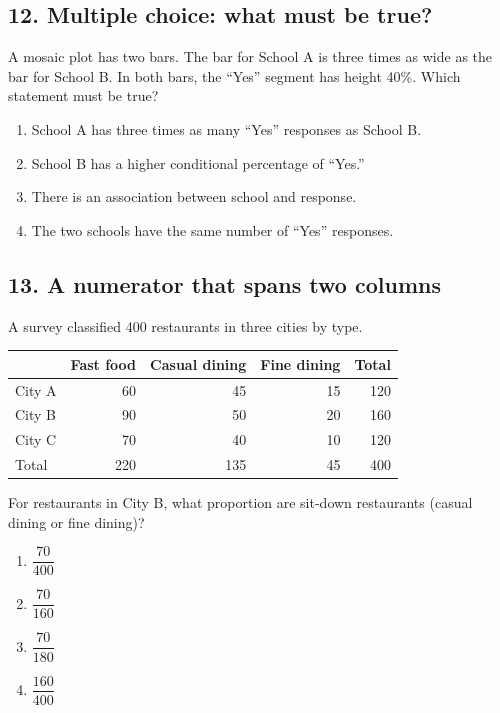 \documentclass[11pt]{article}
\begin{document}
\subsection*{12. Multiple choice: what must be true?}
A mosaic plot has two bars. The bar for School A is three times as wide as the bar for School B. In both bars, the ``Yes'' segment has height 40\%. Which statement must be true?
\par\medskip
\begin{enumerate}[label=\Alph*),itemsep=6pt]
  \item School A has three times as many ``Yes'' responses as School B.
  \item School B has a higher conditional percentage of ``Yes.''
  \item There is an association between school and response.
  \item The two schools have the same number of ``Yes'' responses.
\end{enumerate}

\Needspace{2.2in}
\subsection*{13. A numerator that spans two columns}
A survey classified 400 restaurants in three cities by type.
\begin{center}
\begin{tabular}{l|rrr|r}
 & Fast food & Casual dining & Fine dining & Total\\ \hline
City A & 60 & 45 & 15 & 120\\
City B & 90 & 50 & 20 & 160\\
City C & 70 & 40 & 10 & 120\\ \hline
Total & 220 & 135 & 45 & 400
\end{tabular}
\end{center}
For restaurants in City B, what proportion are sit-down restaurants (casual dining or fine dining)?
\par\medskip
\begin{enumerate}[label=\Alph*),itemsep=4pt]
  \item $\dfrac{70}{400}$
  \item $\dfrac{70}{160}$
  \item $\dfrac{70}{180}$
  \item $\dfrac{160}{400}$
\end{enumerate}

\Needspace{2.4in}
\end{document}

